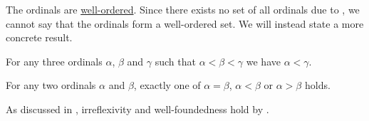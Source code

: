 \begin{proposition}\label{thm:ordinals_are_well_ordered}
  The ordinals are \hyperref[def:well_ordered_set]{well-ordered}. Since there exists no set of all ordinals due to , we cannot say that the ordinals form a well-ordered set. We will instead state a more concrete result.

  \begin{thmenum}
     For any three ordinals \( \alpha \), \( \beta \) and \( \gamma \) such that \( \alpha < \beta < \gamma \) we have \( \alpha < \gamma \).

     For any two ordinals \( \alpha \) and \( \beta \), exactly one of \( \alpha = \beta \), \( \alpha < \beta \) or \( \alpha > \beta \) holds.
  \end{thmenum}

  As discussed in , irreflexivity and well-foundedness hold by .
\end{proposition}
